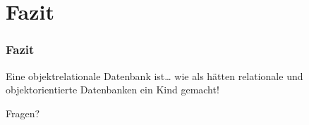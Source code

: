 \section{Fazit}

\begin{frame}
    \frametitle{Fazit}


    \begin{block}{Eine objektrelationale Datenbank ist\dots}
        \pause
        wie als hätten relationale und objektorientierte Datenbanken ein Kind gemacht!
    \end{block}

\end{frame}

\begin{frame}[standout]
    Fragen?
\end{frame}
